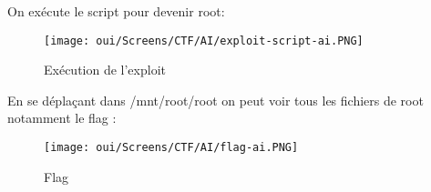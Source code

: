 \newpage
\noindent On exécute le script pour devenir root:

\begin{figure}[htp!]
  \centering
  \setlength\figureheight{7cm}
  \setlength\figurewidth{9cm}
  \texttt{[image: oui/Screens/CTF/AI/exploit-script-ai.PNG]}      
  \caption{Exécution de l'exploit}
  \label{fig:courbe-tikz}
\end{figure}

\noindent En se déplaçant dans /mnt/root/root on peut voir tous les fichiers de root notamment le flag :

\newpage
\begin{figure}[htp!]
  \centering
  \setlength\figureheight{7cm}
  \setlength\figurewidth{9cm}
  \texttt{[image: oui/Screens/CTF/AI/flag-ai.PNG]}      
  \caption{Flag}
  \label{fig:courbe-tikz}
\end{figure}